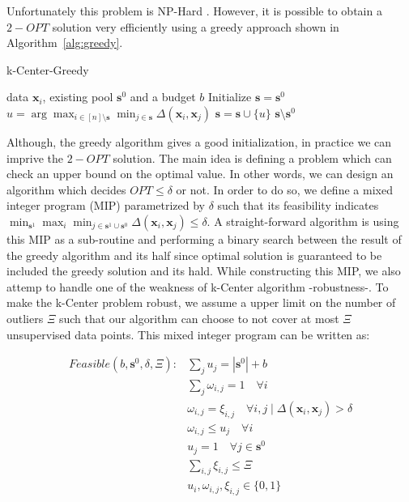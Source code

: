 \documentclass{article}
\begin{document}
Unfortunately this problem is NP-Hard \cite{cook}. However, it is possible to obtain a $2-OPT$ solution very efficiently using a greedy approach shown in  Algorithm~\ref{alg:greedy}.

\begin{algorithm}[ht]
   \caption{k-Center-Greedy}
   \label{alg:greedy}
\begin{algorithmic}
    data $\mathbf{x}_i$, existing pool $\mathbf{s}^0$ and a budget $b$
    \STATE Initialize $\mathbf{s}=\mathbf{s}^0$
   \REPEAT
   \STATE $u=\arg\max_{i \in [n] \setminus \mathbf{s}} \min_{j \in \mathbf{s}} \Delta(\mathbf{x}_i, \mathbf{x}_j)$
   \STATE $\mathbf{s} = \mathbf{s} \cup \{u\}$
    $\mathbf{s} \setminus \mathbf{s}^0$
\end{algorithmic}
\end{algorithm}

Although, the greedy algorithm gives a good initialization, in practice we can imprive the $2-OPT$ solution. The main idea is defining a problem which can check an upper bound on the optimal value. In other words, we can design an algorithm which decides $OPT \leq \delta$ or not. In order to do so, we define a mixed integer program (MIP) parametrized by $\delta$ such that its feasibility indicates $\min_{\mathbf{s}^1} \max_i \min_{j \in \mathbf{s}^1 \cup \mathbf{s}^0} \Delta(\mathbf{x}_i,\mathbf{x}_j) \leq \delta$. A straight-forward algorithm is using this MIP as a sub-routine and performing a binary search between the result of the greedy algorithm and its half since optimal solution is guaranteed to be included the greedy solution and its hald. While constructing this MIP, we also attemp to handle one of the weakness of k-Center algorithm -robustness-. To make the k-Center problem robust, we assume a upper limit on the number of outliers $\Xi$ such that our algorithm can choose to not cover at most $\Xi$ unsupervised data points. This mixed integer program can be written as:

\begin{equation}
\begin{aligned}
Feasible(b,\mathbf{s}^0,\delta, \Xi):  &\sum_j  u_j = |\mathbf{s}^0|+ b \\
&\sum_j \omega_{i,j} = 1 \quad \forall  i \\
   &\omega_{i,j} = \xi_{i,j} \quad  \forall i,j \mid   \Delta(\mathbf{x}_i,\mathbf{x}_j)  > \delta \\
   &\omega_{i,j} \leq u_j \quad \forall  i \\
   &u_j =1 \quad \forall j\in \mathbf{s}^0 \\
   & \sum_{i,j} \xi_{i,j} \leq \Xi \\
   & u_i, \omega_{i,j}, \xi_{i,j} \in \{0,1\}
\end{aligned}
\label{mipfeasible}
\end{equation}
\end{document}
